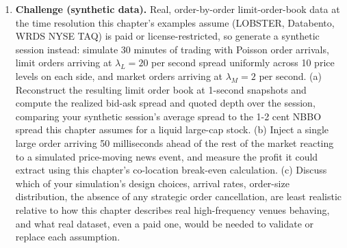 \documentclass[../ai_in_finance]{subfiles}
\begin{document}
\begin{enumerate}[exercises]
    \item \textbf{Challenge (synthetic data).} Real, order-by-order limit-order-book data at the time resolution this chapter's examples assume (LOBSTER, Databento, WRDS NYSE TAQ) is paid or license-restricted, so generate a synthetic session instead: simulate 30 minutes of trading with Poisson order arrivals, limit orders arriving at $\lambda_L=20$ per second spread uniformly across 10 price levels on each side, and market orders arriving at $\lambda_M=2$ per second. (a) Reconstruct the resulting limit order book at 1-second snapshots and compute the realized bid-ask spread and quoted depth over the session, comparing your synthetic session's average spread to the 1-2 cent NBBO spread this chapter assumes for a liquid large-cap stock. (b) Inject a single large order arriving 50 milliseconds ahead of the rest of the market reacting to a simulated price-moving news event, and measure the profit it could extract using this chapter's co-location break-even calculation. (c) Discuss which of your simulation's design choices, arrival rates, order-size distribution, the absence of any strategic order cancellation, are least realistic relative to how this chapter describes real high-frequency venues behaving, and what real dataset, even a paid one, would be needed to validate or replace each assumption.
\end{enumerate}

\end{document}
